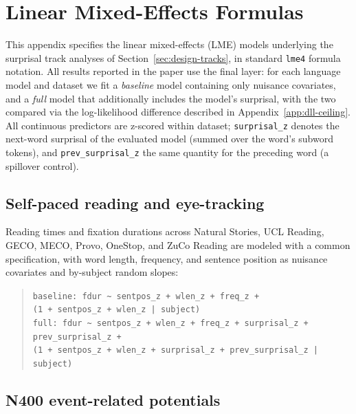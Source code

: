 \section{Linear Mixed-Effects Formulas}
\label{app:lme-formulas}

This appendix specifies the linear mixed-effects (LME) models underlying the surprisal track analyses of Section~\ref{sec:design-tracks}, in standard \texttt{lme4} formula notation. All results reported in the paper use the final layer: for each language model and dataset we fit a \emph{baseline} model containing only nuisance covariates, and a \emph{full} model that additionally includes the model's surprisal, with the two compared via the log-likelihood difference described in Appendix~\ref{app:dll-ceiling}. All continuous predictors are z-scored within dataset; \texttt{surprisal\_z} denotes the next-word surprisal of the evaluated model (summed over the word's subword tokens), and \texttt{prev\_surprisal\_z} the same quantity for the preceding word (a spillover control).

\subsection{Self-paced reading and eye-tracking}

Reading times and fixation durations across Natural Stories, UCL Reading, GECO, MECO, Provo, OneStop, and ZuCo Reading are modeled with a common specification, with word length, frequency, and sentence position as nuisance covariates and by-subject random slopes:
\begin{quote}
\texttt{baseline:\ fdur \textasciitilde\ sentpos\_z + wlen\_z + freq\_z +}\\
\texttt{\phantom{baseline:\ fdur \textasciitilde\ }(1 + sentpos\_z + wlen\_z | subject)}\\
\texttt{full:\ fdur \textasciitilde\ sentpos\_z + wlen\_z + freq\_z + surprisal\_z + prev\_surprisal\_z +}\\
\texttt{\phantom{full:\ fdur \textasciitilde\ }(1 + sentpos\_z + wlen\_z + surprisal\_z + prev\_surprisal\_z | subject)}
\end{quote}

\subsection{N400 event-related potentials}

